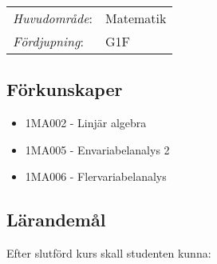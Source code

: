 \begin{tabular}{ll}\emph{Huvudområde}: & Matematik\tabularnewline\emph{Fördjupning}: & G1F\tabularnewline\end{tabular}

\subsection*{Förkunskaper}

\begin{itemize}
\tightlist
\item
  1MA002 - Linjär algebra
\item
  1MA005 - Envariabelanalys 2
\item
  1MA006 - Flervariabelanalys
\end{itemize}

\subsection*{Lärandemål}

Efter slutförd kurs skall studenten kunna:

